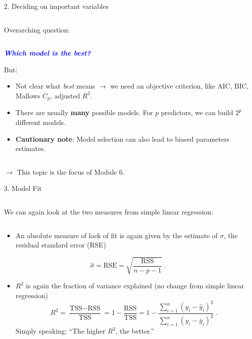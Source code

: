 \documentclass[10pt,ignorenonframetext,]{beamer}
\providecommand{\tightlist}{%
  \setlength{\itemsep}{0pt}\setlength{\parskip}{0pt}}
\begin{document}
\begin{frame}

\begin{block}{2. Deciding on important variables}

\(~\)

Overarching question:

\(~\)

\begin{center}
 \emph{\textcolor{blue}{\bf Which model is the best?}}
\end{center}

\vspace{2mm}

But:

\begin{itemize}
\item
  Not clear what \emph{best} means \(\rightarrow\) we need an objective
  criterion, like AIC, BIC, Mallows \(C_p\), adjusted \(R^2\).
\item
  There are usually \textbf{many} possible models. For \(p\) predictors,
  we can build \(2^p\) different models.
\item
  \textbf{Cautionary note}: Model selection can also lead to biased
  parameters estimates.
\end{itemize}

\(~\)

\(\rightarrow\) This topic is the focus of Module 6.

\end{block}

\end{frame}

\begin{frame}

\begin{block}{3. Model Fit}

\(~\)

We can again look at the two measures from simple linear regression:

\(~\)

\begin{itemize}
\tightlist
\item
  An absolute measure of lack of fit is again given by the estimate of
  \(\sigma\), the residual standard error (RSE)
\end{itemize}

\[\hat\sigma = \text{RSE}= \sqrt{ \frac{ \text{RSS}}{n-p-1}} \ . \]

\begin{itemize}
\tightlist
\item
  \(R^2\) is again the fraction of variance explained (no change from
  simple linear regression)
  \[R^2 = \frac{\text{TSS}-\text{RSS}}{\text{TSS}}= 1-\frac{\text{RSS}}{\text{TSS}}=1-\frac{\sum_{i=1}^n(y_i-\hat{y}_i)^2}{\sum_{i=1}^n(y_i-\bar{y}_i)^2} \ .\]
  Simply speaking: ``The higher \(R^2\), the better.''
\end{itemize}

\end{block}

\end{frame}
\end{document}
